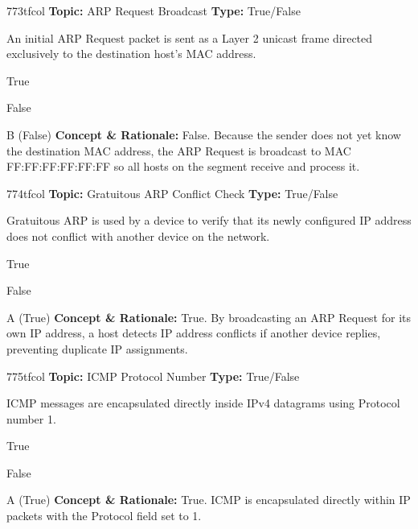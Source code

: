 \begin{qcard}{773}{tfcol}
\textcolor{darkslate!75}{\small\textbf{Topic:} ARP Request Broadcast \hfill \textbf{Type:} True/False}\vspace{0.4em}\par
An initial ARP Request packet is sent as a Layer 2 unicast frame directed exclusively to the destination host's MAC address.
\begin{qoptions}
\item True
\item False
\end{qoptions}
\end{qcard}
\nopagebreak
\begin{explainbox}{B (False)}
\textbf{Concept \& Rationale:} False. Because the sender does not yet know the destination MAC address, the ARP Request is broadcast to MAC FF:FF:FF:FF:FF:FF so all hosts on the segment receive and process it.
\end{explainbox}

\begin{qcard}{774}{tfcol}
\textcolor{darkslate!75}{\small\textbf{Topic:} Gratuitous ARP Conflict Check \hfill \textbf{Type:} True/False}\vspace{0.4em}\par
Gratuitous ARP is used by a device to verify that its newly configured IP address does not conflict with another device on the network.
\begin{qoptions}
\item True
\item False
\end{qoptions}
\end{qcard}
\nopagebreak
\begin{explainbox}{A (True)}
\textbf{Concept \& Rationale:} True. By broadcasting an ARP Request for its own IP address, a host detects IP address conflicts if another device replies, preventing duplicate IP assignments.
\end{explainbox}

\begin{qcard}{775}{tfcol}
\textcolor{darkslate!75}{\small\textbf{Topic:} ICMP Protocol Number \hfill \textbf{Type:} True/False}\vspace{0.4em}\par
ICMP messages are encapsulated directly inside IPv4 datagrams using Protocol number 1.
\begin{qoptions}
\item True
\item False
\end{qoptions}
\end{qcard}
\nopagebreak
\begin{explainbox}{A (True)}
\textbf{Concept \& Rationale:} True. ICMP is encapsulated directly within IP packets with the Protocol field set to 1.
\end{explainbox}

